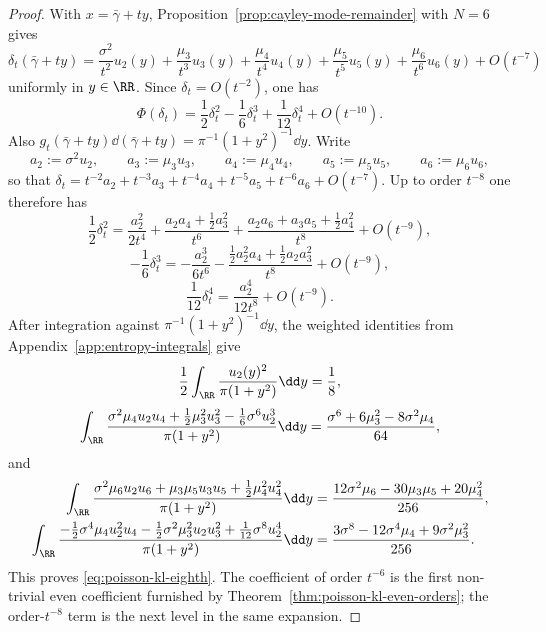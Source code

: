 \begin{proof}
With $x=\bar\gamma+ty$, Proposition~\ref{prop:cayley-mode-remainder} with
$N=6$ gives
\[
\delta_t(\bar\gamma+ty)
=\frac{\sigma^2}{t^2}u_2(y)
+\frac{\mu_3}{t^3}u_3(y)
+\frac{\mu_4}{t^4}u_4(y)
+\frac{\mu_5}{t^5}u_5(y)
+\frac{\mu_6}{t^6}u_6(y)
+O(t^{-7})
\]
uniformly in $y\in\RR$.  Since $\delta_t=O(t^{-2})$, one has
\[
\Phi(\delta_t)
=\frac12\delta_t^2-\frac16\delta_t^3+\frac1{12}\delta_t^4+O(t^{-10}).
\]
Also $g_t(\bar\gamma+ty)\dd(\bar\gamma+ty)=\pi^{-1}(1+y^2)^{-1}\dd y$.
Write
\[
a_2:=\sigma^2u_2,\qquad a_3:=\mu_3u_3,\qquad a_4:=\mu_4u_4,
\qquad a_5:=\mu_5u_5,\qquad a_6:=\mu_6u_6,
\]
so that $\delta_t=t^{-2}a_2+t^{-3}a_3+t^{-4}a_4+t^{-5}a_5+t^{-6}a_6+O(t^{-7})$.
Up to order $t^{-8}$ one therefore has
\[
\frac12\delta_t^2
=\frac{a_2^2}{2t^4}
+\frac{a_2a_4+\frac12 a_3^2}{t^6}
+\frac{a_2a_6+a_3a_5+\frac12 a_4^2}{t^8}
+O(t^{-9}),
\]
\[
-\frac16\delta_t^3
=-\frac{a_2^3}{6t^6}
-\frac{\frac12 a_2^2a_4+\frac12 a_2a_3^2}{t^8}
+O(t^{-9}),
\]
\[
\frac1{12}\delta_t^4
=\frac{a_2^4}{12t^8}+O(t^{-9}).
\]
After integration against $\pi^{-1}(1+y^2)^{-1}\dd y$, the weighted
identities from Appendix~\ref{app:entropy-integrals} give
\[
\frac12\int_{\RR}\frac{u_2(y)^2}{\pi(1+y^2)}\dd y=\frac18,
\]
\[
\int_{\RR}\frac{\sigma^2\mu_4u_2u_4+\frac12\mu_3^2u_3^2-\frac16\sigma^6u_2^3}
{\pi(1+y^2)}\dd y
=\frac{\sigma^6+6\mu_3^2-8\sigma^2\mu_4}{64},
\]
and
\begin{align*}
\int_{\RR}
\frac{\sigma^2\mu_6u_2u_6+\mu_3\mu_5u_3u_5+\frac12\mu_4^2u_4^2}
{\pi(1+y^2)}\dd y
&=\frac{12\sigma^2\mu_6-30\mu_3\mu_5+20\mu_4^2}{256},
\\
\int_{\RR}
\frac{-\frac12\sigma^4\mu_4u_2^2u_4-\frac12\sigma^2\mu_3^2u_2u_3^2
+\frac1{12}\sigma^8u_2^4}{\pi(1+y^2)}\dd y
&=\frac{3\sigma^8-12\sigma^4\mu_4+9\sigma^2\mu_3^2}{256}.
\end{align*}
This proves \eqref{eq:poisson-kl-eighth}.  The coefficient of order
$t^{-6}$ is the first non-trivial even coefficient furnished by
Theorem~\ref{thm:poisson-kl-even-orders}; the order-$t^{-8}$ term is the
next level in the same expansion.
\end{proof}

